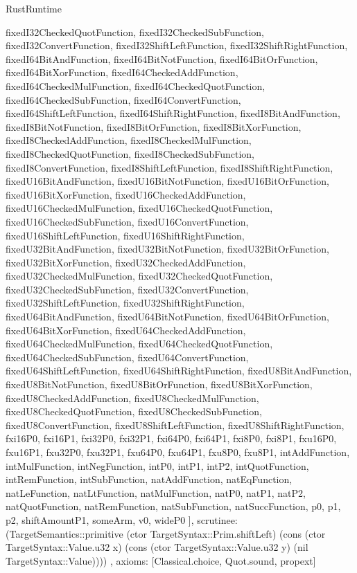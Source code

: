 \begin{lexlean}{RustRuntime}
\begin{semanticmodule}
{{      fixedI32CheckedQuotFunction,
      fixedI32CheckedSubFunction,
      fixedI32ConvertFunction,
      fixedI32ShiftLeftFunction,
      fixedI32ShiftRightFunction,
      fixedI64BitAndFunction,
      fixedI64BitNotFunction,
      fixedI64BitOrFunction,
      fixedI64BitXorFunction,
      fixedI64CheckedAddFunction,
      fixedI64CheckedMulFunction,
      fixedI64CheckedQuotFunction,
      fixedI64CheckedSubFunction,
      fixedI64ConvertFunction,
      fixedI64ShiftLeftFunction,
      fixedI64ShiftRightFunction,
      fixedI8BitAndFunction,
      fixedI8BitNotFunction,
      fixedI8BitOrFunction,
      fixedI8BitXorFunction,
      fixedI8CheckedAddFunction,
      fixedI8CheckedMulFunction,
      fixedI8CheckedQuotFunction,
      fixedI8CheckedSubFunction,
      fixedI8ConvertFunction,
      fixedI8ShiftLeftFunction,
      fixedI8ShiftRightFunction,
      fixedU16BitAndFunction,
      fixedU16BitNotFunction,
      fixedU16BitOrFunction,
      fixedU16BitXorFunction,
      fixedU16CheckedAddFunction,
      fixedU16CheckedMulFunction,
      fixedU16CheckedQuotFunction,
      fixedU16CheckedSubFunction,
      fixedU16ConvertFunction,
      fixedU16ShiftLeftFunction,
      fixedU16ShiftRightFunction,
      fixedU32BitAndFunction,
      fixedU32BitNotFunction,
      fixedU32BitOrFunction,
      fixedU32BitXorFunction,
      fixedU32CheckedAddFunction,
      fixedU32CheckedMulFunction,
      fixedU32CheckedQuotFunction,
      fixedU32CheckedSubFunction,
      fixedU32ConvertFunction,
      fixedU32ShiftLeftFunction,
      fixedU32ShiftRightFunction,
      fixedU64BitAndFunction,
      fixedU64BitNotFunction,
      fixedU64BitOrFunction,
      fixedU64BitXorFunction,
      fixedU64CheckedAddFunction,
      fixedU64CheckedMulFunction,
      fixedU64CheckedQuotFunction,
      fixedU64CheckedSubFunction,
      fixedU64ConvertFunction,
      fixedU64ShiftLeftFunction,
      fixedU64ShiftRightFunction,
      fixedU8BitAndFunction,
      fixedU8BitNotFunction,
      fixedU8BitOrFunction,
      fixedU8BitXorFunction,
      fixedU8CheckedAddFunction,
      fixedU8CheckedMulFunction,
      fixedU8CheckedQuotFunction,
      fixedU8CheckedSubFunction,
      fixedU8ConvertFunction,
      fixedU8ShiftLeftFunction,
      fixedU8ShiftRightFunction,
      fxi16P0,
      fxi16P1,
      fxi32P0,
      fxi32P1,
      fxi64P0,
      fxi64P1,
      fxi8P0,
      fxi8P1,
      fxu16P0,
      fxu16P1,
      fxu32P0,
      fxu32P1,
      fxu64P0,
      fxu64P1,
      fxu8P0,
      fxu8P1,
      intAddFunction,
      intMulFunction,
      intNegFunction,
      intP0,
      intP1,
      intP2,
      intQuotFunction,
      intRemFunction,
      intSubFunction,
      natAddFunction,
      natEqFunction,
      natLeFunction,
      natLtFunction,
      natMulFunction,
      natP0,
      natP1,
      natP2,
      natQuotFunction,
      natRemFunction,
      natSubFunction,
      natSuccFunction,
      p0,
      p1,
      p2,
      shiftAmountP1,
      someArm,
      v0,
      wideP0
    ],
    scrutinee: (TargetSemantics::primitive (ctor TargetSyntax::Prim.shiftLeft) (cons (ctor TargetSyntax::Value.u32 x) (cons (ctor TargetSyntax::Value.u32 y) (nil TargetSyntax::Value))))
  },
  axioms: [Classical.choice, Quot.sound, propext]
}


\end{semanticmodule}
\end{lexlean}
